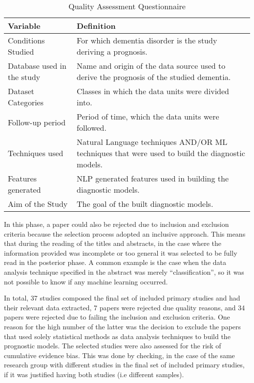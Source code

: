 \documentclass[12pt]{article}
\begin{document}
\begin{table}[H]
	\begin{center}
	\begin{tabular}{ | p{6cm} | p{6cm} | }
	\hline
	Variable & Definition \\ \hline
	Conditions Studied & For which dementia disorder is the study deriving a prognosis. \\ \hline
	Database used in the study & Name and origin of the data source used to derive the prognosis of the studied dementia. \\ \hline
	Dataset Categories & Classes in which the data units were divided into. \\ \hline
	Follow-up period & Period of time, which the data units were followed. \\ \hline
	Techniques used & Natural Language techniques AND/OR ML techniques that were used to build the diagnostic models. \\ \hline 
	Features generated & NLP generated features used in building the diagnostic models. \\ \hline
	Aim of the Study & The goal of the built diagnostic models. \\
	\hline 
	\end{tabular}
	\caption[Table caption text]{Quality Assessment Questionnaire}
	\label{table:name}
	\end{center}
\end{table}

In this phase, a paper could also be rejected due to inclusion and exclusion criteria because the selection process adopted an inclusive approach. This means that during the reading of the titles and abstracts, in the case where the information provided was incomplete or too general it was selected to be fully read in the posterior phase. A common example is the case when the data analysis technique specified in the abstract was merely “classification”, so it was not possible to know if any machine learning occurred.
\par
In total, 37 studies composed the final set of included primary studies and had their relevant data extracted, 7 papers were rejected due quality reasons, and 34 papers were rejected due to failing the inclusion and exclusion criteria. One reason for the high number of the latter was the decision to exclude the papers that used solely statistical methods as data analysis techniques to build the prognostic models. The selected studies were also assessed for the risk of cumulative evidence bias. This was done by checking, in the case of the same research group with different studies in the final set of included primary studies, if it was justified having both studies (i.e different samples).
\end{document}
